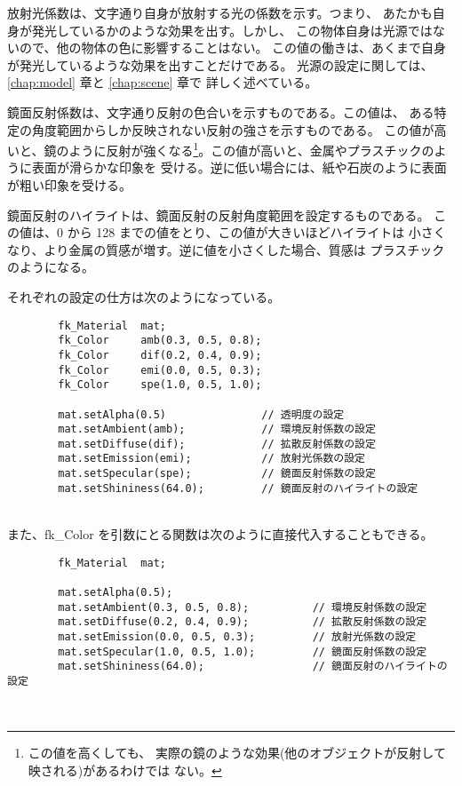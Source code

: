 放射光係数は、文字通り自身が放射する光の係数を示す。つまり、
あたかも自身が発光しているかのような効果を出す。しかし、
この物体自身は光源ではないので、他の物体の色に影響することはない。
この値の働きは、あくまで自身が発光しているような効果を出すことだけである。
光源の設定に関しては、\ref{chap:model} 章と \ref{chap:scene} 章で
詳しく述べている。

鏡面反射係数は、文字通り反射の色合いを示すものである。この値は、
ある特定の角度範囲からしか反映されない反射の強さを示すものである。
この値が高いと、鏡のように反射が強くなる\footnote{この値を高くしても、
実際の鏡のような効果(他のオブジェクトが反射して映される)があるわけでは
ない。}。この値が高いと、金属やプラスチックのように表面が滑らかな印象を
受ける。逆に低い場合には、紙や石炭のように表面が粗い印象を受ける。

鏡面反射のハイライトは、鏡面反射の反射角度範囲を設定するものである。
この値は、0 から 128 までの値をとり、この値が大きいほどハイライトは
小さくなり、より金属の質感が増す。逆に値を小さくした場合、質感は
プラスチックのようになる。

それぞれの設定の仕方は次のようになっている。
\\
\begin{breakbox}
\begin{verbatim}
        fk_Material  mat;
        fk_Color     amb(0.3, 0.5, 0.8);
        fk_Color     dif(0.2, 0.4, 0.9);
        fk_Color     emi(0.0, 0.5, 0.3);
        fk_Color     spe(1.0, 0.5, 1.0);

        mat.setAlpha(0.5)               // 透明度の設定
        mat.setAmbient(amb);            // 環境反射係数の設定
        mat.setDiffuse(dif);            // 拡散反射係数の設定
        mat.setEmission(emi);           // 放射光係数の設定
        mat.setSpecular(spe);           // 鏡面反射係数の設定
        mat.setShininess(64.0);         // 鏡面反射のハイライトの設定
\end{verbatim}
\end{breakbox}
~ \\
また、fk\_Color を引数にとる関数は次のように直接代入することもできる。
\\
\begin{breakbox}
\begin{verbatim}
        fk_Material  mat;

        mat.setAlpha(0.5);
        mat.setAmbient(0.3, 0.5, 0.8);          // 環境反射係数の設定
        mat.setDiffuse(0.2, 0.4, 0.9);          // 拡散反射係数の設定
        mat.setEmission(0.0, 0.5, 0.3);         // 放射光係数の設定
        mat.setSpecular(1.0, 0.5, 1.0);         // 鏡面反射係数の設定
        mat.setShininess(64.0);                 // 鏡面反射のハイライトの設定
\end{verbatim}
\end{breakbox}
~

